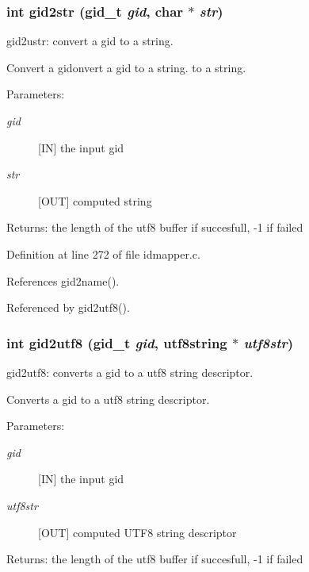 \subsubsection{\setlength{\rightskip}{0pt plus 5cm}int gid2str (gid\_\-t {\em gid}, char $\ast$ {\em str})}\label{idmapper_8c_a5}


gid2ustr: convert a gid to a string.

Convert a gidonvert a gid to a string. to a string.

\begin{Desc}
\item[Parameters:]
\begin{description}
\item[{\em gid}][IN] the input gid \item[{\em str}][OUT] computed string\end{description}
\end{Desc}
\begin{Desc}
\item[Returns:]the length of the utf8 buffer if succesfull, -1 if failed \end{Desc}


Definition at line 272 of file idmapper.c.

References gid2name().

Referenced by gid2utf8().
\subsubsection{\setlength{\rightskip}{0pt plus 5cm}int gid2utf8 (gid\_\-t {\em gid}, utf8string $\ast$ {\em utf8str})}\label{idmapper_8c_a7}


gid2utf8: converts a gid to a utf8 string descriptor.

Converts a gid to a utf8 string descriptor.

\begin{Desc}
\item[Parameters:]
\begin{description}
\item[{\em gid}][IN] the input gid \item[{\em utf8str}][OUT] computed UTF8 string descriptor\end{description}
\end{Desc}
\begin{Desc}
\item[Returns:]the length of the utf8 buffer if succesfull, -1 if failed \end{Desc}


